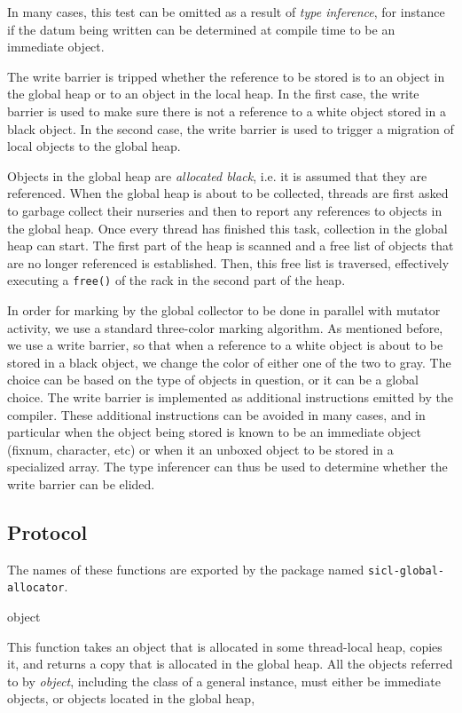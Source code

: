 In many cases, this test can be omitted as a result of \emph{type
  inference}, for instance if the datum being written can be
determined at compile time to be an immediate object.

The write barrier is tripped whether the reference to be stored is to
an object in the global heap or to an object in the local heap.  In
the first case, the write barrier is used to make sure there is not a
reference to a white object stored in a black object.  In the second
case, the write barrier is used to trigger a migration of local
objects to the global heap.

Objects in the global heap are \emph{allocated black}, i.e. it is
assumed that they are referenced.  When the global heap is about to be
collected, threads are first asked to garbage collect their nurseries
and then to report any references to objects in the global heap.  Once
every thread has finished this task, collection in the global heap can
start.  The first part of the heap is scanned and a free list of
objects that are no longer referenced is established.  Then, this free
list is traversed, effectively executing a \texttt{free()} of the rack
in the second part of the heap.

In order for marking by the global collector to be done in parallel
with mutator activity, we use a standard three-color marking
algorithm.  As mentioned before, we use a write barrier, so that when
a reference to a white object is about to be stored in a black object,
we change the color of either one of the two to gray.  The choice can
be based on the type of objects in question, or it can be a global
choice.  The write barrier is implemented as additional instructions
emitted by the compiler.  These additional instructions can be avoided
in many cases, and in particular when the object being stored is known
to be an immediate object (fixnum, character, etc) or when it an
unboxed object to be stored in a specialized array.  The type
inferencer can thus be used to determine whether the write barrier can
be elided.

\subsection{Protocol}

The names of these functions are exported by the package named
\texttt{sicl-global-allocator}.

 {object}

This function takes an object that is allocated in some thread-local
heap, copies it, and returns a copy that is allocated in the global
heap.  All the objects referred to by \textit{object}, including the
class of a general instance, must either be immediate objects, or
objects located in the global heap,


